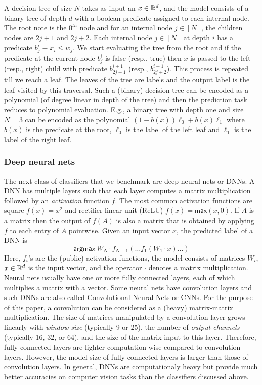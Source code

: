 A decision tree of size $N$ takes as input an $x\in{\mathbb{R}}^d$, and the
model consists of a binary tree of depth $d$ with a boolean predicate
assigned to each internal node. The root note is the $0^{th}$ node and
for an internal node $j \in [N]$, the children nodes are $2j+1$ and
$2j+2$. Each internal node $j\in[N]$ at depth $i$ has a predicate
$b_{j}^i\equiv x_i\leq w_{j}$. We start evaluating the tree from the
root and if the predicate at the current node $b_j^i$ is false (resp.,
true) then $x$ is passed to the left (resp., right) child with
predicate $b_{2j+1}^{i+1}$ (resp., $b_{2j+2}^{i+1}$). This process is
repeated till we reach a leaf. The leaves of the tree are labels and
the output label is the leaf visited by this traversal.
Such a (binary) decision tree can be encoded as a polynomial (of
degree linear in depth of the tree) and then the prediction task
reduces to polynomial evaluation. E.g., a binary tree with depth one
and size $N=3$ can be encoded as the polynomial
$(1-b(x))\ell_0 + b(x)\ell_1$ where $b(x)$ is the predicate at the
root, $\ell_0$ is the label of the left leaf and $\ell_1$ is the label
of the right leaf.

\subsubsection*{Deep neural nets}
The next class of classifiers that we benchmark are deep neural nets
or DNNs. A DNN has multiple layers such that each layer computes a
matrix
multiplication followed by an {\it activation} function $f$. The most
common activation functions are square $f(x)=x^2$ and rectifier linear
unit (ReLU) $f(x)=\mathsf{max}(x,0)$.
If $A$ is a matrix then the output of $f(A)$ is also a matrix that is
obtained by applying $f$ to each entry of $A$ pointwise.
Given an input vector $x$, the predicted label of a DNN is
\[
 \mathsf{argmax}\ W_N\cdot f_{N-1}(\ldots f_1(W_1\cdot x)\ldots)
\]
Here, $f_i$'s are the (public) activation functions, the model
consists of matrices $W_i$,  $x \in {\mathbb{R}}^d$ is the input vector, and the
operator $\cdot$ denotes a matrix multiplication.
Neural nets usually have one or more fully connected layers, each of
which multiplies a matrix with a vector.
Some neural nets have convolution layers and such DNNs are also called
Convolutional Neural Nets or CNNs.
For the purpose of this paper, a convolution can be considered as a
(heavy) matrix-matrix multiplication. The size of matrices manipulated
by a convolution layer grows linearly with {\it window size}
(typically 9 or 25), the number of {\it output channels} (typically
16, 32, or 64), and the size of the matrix input to this layer.
Therefore, fully connected layers are lighter computation-wise compared
to convolution layers. However, the model size of fully connected
layers is larger than those of convolution layers.
In general, DNNs are computationaly heavy but provide
much better accuracies on computer vision tasks than the classifiers
discussed above.

